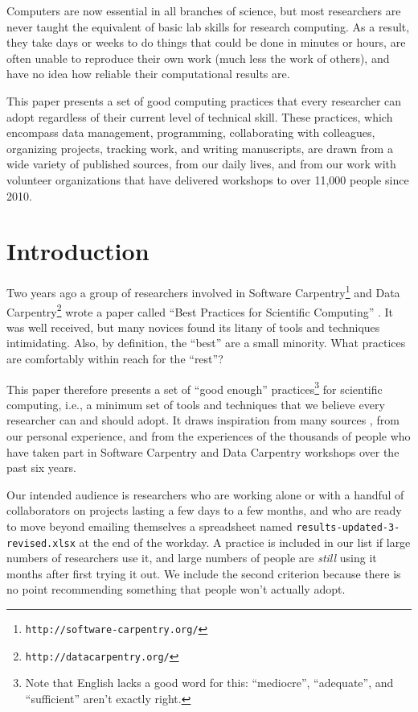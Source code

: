 \documentclass[10pt,letterpaper]{article}
\newcommand{\withurl}[2]{{#1}\footnote{{\texttt{#2}}}}
\begin{document}
Computers are now essential in all branches of science, but most
researchers are never taught the equivalent of basic lab skills for
research computing.  As a result, they take days or weeks to do things
that could be done in minutes or hours, are often unable to reproduce
their own work (much less the work of others), and have no idea how
reliable their computational results are.

This paper presents a set of good computing practices that every
researcher can adopt regardless of their current level of technical
skill.  These practices, which encompass data management, programming,
collaborating with colleagues, organizing projects, tracking work, and
writing manuscripts, are drawn from a wide variety of published
sources, from our daily lives, and from our work with volunteer
organizations that have delivered workshops to over 11,000 people
since 2010.

\linenumbers

\section*{Introduction}\label{sec:introduction}

Two years ago a group of researchers involved in \withurl{Software
Carpentry}{http://software-carpentry.org/} and \withurl{Data
Carpentry}{http://datacarpentry.org/} wrote a paper called
``Best Practices for Scientific Computing'' \cite{wilson2014}.
It was well received, but many novices found its
litany of tools and techniques intimidating.  Also, by definition, the
``best'' are a small minority.
What practices are comfortably within reach for the ``rest''?

This paper therefore presents a set of ``good enough''
practices\footnote{Note that English lacks a good word for this:
  ``mediocre'', ``adequate'', and ``sufficient'' aren't exactly
  right.} for scientific computing, i.e., a minimum set of tools and
techniques that we believe every researcher can and should adopt. It
draws inspiration from many sources
\cite{gentzkow2014,noble2009,brown2015,wickham2014,kitzes2016,sandve2013,hart2015},
from our personal experience, and from the experiences of the
thousands of people who have taken part in Software Carpentry and
Data Carpentry workshops over the past six years.

Our intended audience is researchers who are working alone or with a
handful of collaborators on projects lasting a few days to a few
months, and who are ready to move beyond emailing themselves a spreadsheet
named \texttt{results-updated-3-revised.xlsx} at the end of the workday. A
practice is included in our list if large numbers of researchers use
it, and large numbers of people are \emph{still} using it months
after first trying it out. We include the second criterion because
there is no point recommending something that people won't actually
adopt.
\end{document}
